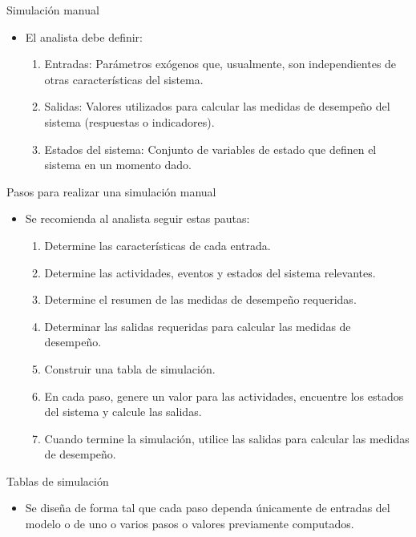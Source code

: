 \begin{frame}{Simulación manual}
    \begin{itemize}
        \item El analista debe definir:
        \begin{enumerate}
            \item Entradas: Parámetros exógenos que, usualmente, son independientes de otras características del sistema.
            \item Salidas: Valores utilizados para calcular las medidas de desempeño del sistema (respuestas o indicadores).
            \item Estados del sistema: Conjunto de variables de estado que definen el sistema en un momento dado.
        \end{enumerate}
    \end{itemize}
\end{frame}

\begin{frame}{Pasos para realizar una simulación manual}
    \begin{itemize}
        \item Se recomienda al analista seguir estas pautas:
        \begin{enumerate}
            \item Determine las características de cada entrada.
            \item Determine las actividades, eventos y estados del sistema relevantes.
            \item Determine el resumen de las medidas de desempeño requeridas.
            \item Determinar las salidas requeridas para calcular las medidas de desempeño.
            \item Construir una tabla de simulación.
            \item En cada paso, genere un valor para las actividades, encuentre los estados del sistema y calcule las salidas.
            \item Cuando termine la simulación, utilice las salidas para calcular las medidas de desempeño.
        \end{enumerate}
    \end{itemize}
\end{frame}

\begin{frame}{Tablas de simulación}
    \begin{itemize}
        \item Se diseña de forma tal que cada paso dependa únicamente de entradas del modelo o de uno o varios pasos o valores previamente computados.
    \end{itemize}
\end{frame}

